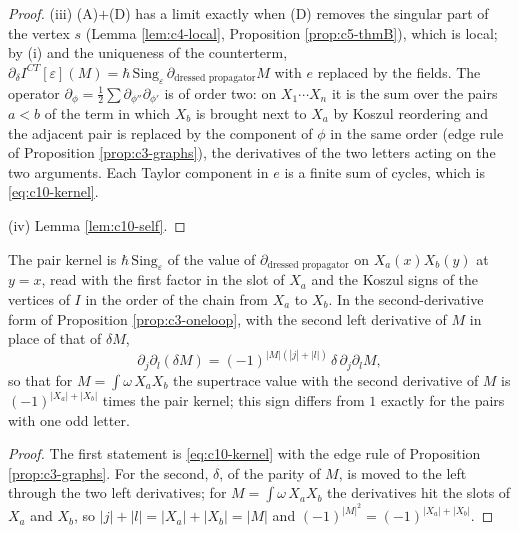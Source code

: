 \begin{proof}
(iii) (A)$+$(D) has a limit exactly when (D) removes the singular part of the vertex $s$ (Lemma \ref{lem:c4-local}, Proposition \ref{prop:c5-thmB}), which is local; by (i) and the uniqueness of the counterterm, $\partial_\delta I^{CT}[\varepsilon](M)=\hbar\,\mathrm{Sing}_\varepsilon\,\partial_{\text{dressed propagator}}M$ with $e$ replaced by the fields. The operator $\partial_\phi=\tfrac12\sum\partial_{\phi''}\partial_{\phi'}$ is of order two: on $X_1\cdots X_n$ it is the sum over the pairs $a<b$ of the term in which $X_b$ is brought next to $X_a$ by Koszul reordering and the adjacent pair is replaced by the component of $\phi$ in the same order (edge rule of Proposition \ref{prop:c3-graphs}), the derivatives of the two letters acting on the two arguments. Each Taylor component in $e$ is a finite sum of cycles, which is \eqref{eq:c10-kernel}.

(iv) Lemma \ref{lem:c10-self}.
\end{proof}

\begin{lemma}
\label{lem:c10-sign}
The pair kernel is $\hbar\,\mathrm{Sing}_\varepsilon$ of the value of $\partial_{\text{dressed propagator}}$ on $X_a(x)X_b(y)$ at $y=x$, read with the first factor in the slot of $X_a$ and the Koszul signs of the vertices of $I$ in the order of the chain from $X_a$ to $X_b$. In the second-derivative form of Proposition \ref{prop:c3-oneloop}, with the second left derivative of $M$ in place of that of $\delta M$,
\[
\partial_j\partial_l(\delta M)=(-1)^{|M|(|j|+|l|)}\,\delta\,\partial_j\partial_lM,
\]
so that for $M=\int\omega\,X_aX_b$ the supertrace value with the second derivative of $M$ is $(-1)^{|X_a|+|X_b|}$ times the pair kernel; this sign differs from $1$ exactly for the pairs with one odd letter.
\end{lemma}

\begin{proof}
The first statement is \eqref{eq:c10-kernel} with the edge rule of Proposition \ref{prop:c3-graphs}. For the second, $\delta$, of the parity of $M$, is moved to the left through the two left derivatives; for $M=\int\omega\,X_aX_b$ the derivatives hit the slots of $X_a$ and $X_b$, so $|j|+|l|=|X_a|+|X_b|=|M|$ and $(-1)^{|M|^2}=(-1)^{|X_a|+|X_b|}$.
\end{proof}

